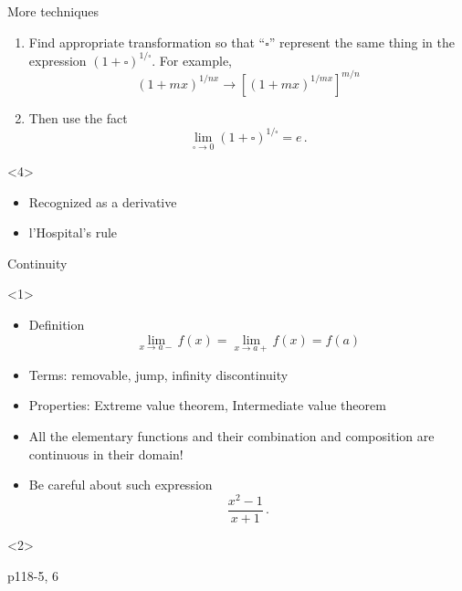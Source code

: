 \begin{frame}{More techniques}
\begin{onlyenv}
\begin{itemize}
\begin{enumerate}
\item Find appropriate transformation so that ``$\square$'' represent
the same thing in the expression $\left(1+\square\right)^{1/\square}$.
For example,
\[
\left(1+mx\right)^{1/nx}\longrightarrow\left[\left(1+mx\right)^{1/mx}\right]^{m/n}
\]

\item Then use the fact
\[
\lim_{\square\to0}\left(1+\square\right)^{1/\square}=e\,.
\]

\end{enumerate}
\end{itemize}
\end{onlyenv}



\begin{onlyenv}<4>

\begin{itemize}
\item Recognized as a derivative
\item l'Hospital's rule
\end{itemize}
\end{onlyenv}

\end{frame}

\begin{frame}{Continuity}

\begin{onlyenv}<1>

\begin{itemize}
\item Definition
\[
\lim_{x\to a-}f\left(x\right)=\lim_{x\to a+}f\left(x\right)=f\left(a\right)
\]

\item Terms: removable, jump, infinity discontinuity
\item Properties: Extreme value theorem, Intermediate value theorem
\item \alert{All the elementary functions and their combination and composition
are continuous in their domain!}
\item Be careful about such expression
\[
\frac{x^{2}-1}{x+1}\,.
\]

\end{itemize}
\end{onlyenv}



\begin{onlyenv}<2>

\begin{example}
p118-5, 6
\end{example}

\end{onlyenv}

\end{frame}



